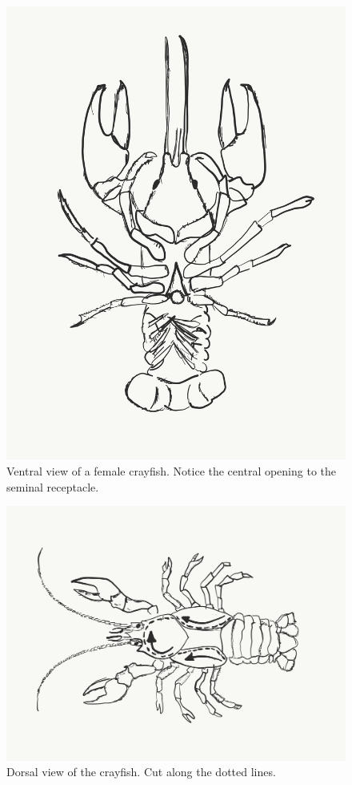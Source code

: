 \begin{figure}

{\centering \includegraphics[width=0.7\linewidth]{./figures/nematoda/female_crayfish}

}

\caption{Ventral view of a female crayfish. Notice the central opening to the seminal receptacle.}\label{fig:femalecray}
\end{figure}

\begin{figure}

{\centering \includegraphics[width=0.7\linewidth]{./figures/nematoda/crayfish_dorsal}

}

\caption{Dorsal view of the crayfish. Cut along the dotted lines.}\label{fig:dorsal}
\end{figure}

